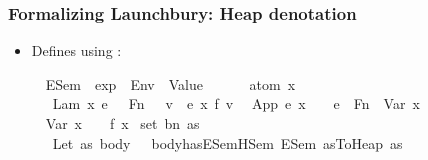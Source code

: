 \documentclass{beamer}
\begin{document}
\begin{frame}
\frametitle{Formalizing Launchbury: Heap denotation}

\begin{itemize}
\item Defines using :
\begin{isabelle}
\isamarkupfalse%
\isanewline
\ \ ESem\ {\isacharcolon}{\isacharcolon}\ {\isachardoublequoteopen}exp\ {\isasymRightarrow}\ Env\ {\isasymRightarrow}\ Value{\isachardoublequoteclose}\ {\isacharparenleft}{\isachardoublequoteopen}{\isasymlbrakk}{\isacharunderscore}{\isasymrbrakk}\isactrlbsub {\isacharunderscore}\isactrlesub {\isachardoublequoteclose}\ \ {\isacharbrackleft}{}{}{\isacharcomma}{}{}{\isacharbrackright}\ {}{}{\isacharparenright}\isanewline
{}\isanewline
\ \ {\isachardoublequoteopen}atom\ x\ {\isasymsharp}\ {\isasymrho}\ {\isasymLongrightarrow}\isanewline
\ \ {\isasymlbrakk}\ Lam\ {\isacharbrackleft}x{\isacharbrackright}{\isachardot}\ e\ {\isasymrbrakk}\isactrlbsub {\isasymrho}\isactrlesub \ {\isacharequal}\ Fn\ {\isasymcdot}\ {\isacharparenleft}{\isasymLambda}\ v{\isachardot}\ {\isacharparenleft}{\isasymlbrakk}\ e\ {\isasymrbrakk}\isactrlbsub {\isasymrho}{\isacharparenleft}x\ f{\isasymmapsto}\ v{\isacharparenright}\isactrlesub {\isacharparenright}{\isacharparenright}{\isachardoublequoteclose}\isanewline
{\isacharbar}\ {\isachardoublequoteopen}{\isasymlbrakk}\ App\ e\ x\ {\isasymrbrakk}\isactrlbsub {\isasymrho}\isactrlesub \ {\isacharequal}\ {\isasymlbrakk}\ e\ {\isasymrbrakk}\isactrlbsub {\isasymrho}\isactrlesub \ {\isasymdown}Fn\ {\isasymlbrakk}\ Var\ x\ {\isasymrbrakk}\isactrlbsub {\isasymrho}\isactrlesub{\isachardoublequoteclose}\isanewline
{\isacharbar}\ {\isachardoublequoteopen}{\isasymlbrakk}\ Var\ x\ {\isasymrbrakk}\isactrlbsub {\isasymrho}\isactrlesub \ {\isacharequal}\ {\isasymrho}\ f{\isacharbang}\ x{\isachardoublequoteclose}\isanewline
{\isacharbar}\ {\isachardoublequoteopen}set\ {\isacharparenleft}bn\ as{\isacharparenright}\ {\isasymsharp}{\isacharasterisk}\ {\isasymrho}\ {\isasymLongrightarrow}\isanewline
\ \ {\isasymlbrakk}\ Let\ as\ body\ {\isasymrbrakk}\isactrlbsub {\isasymrho}\isactrlesub \ {\isacharequal}\ {\isasymlbrakk}body{\isasymrbrakk}\isactrlbsub has{\isacharunderscore}ESem{\isachardot}HSem\ ESem\ {\isacharparenleft}asToHeap\ as{\isacharparenright}\ {\isasymrho}\isactrlesub {\isachardoublequoteclose}
\end{isabelle}

\end{itemize}
\end{frame}
\end{document}
